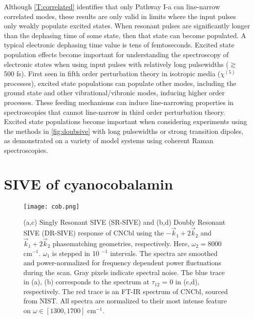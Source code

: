 \documentclass[aip, jcp, draft, onecolumn]{revtex4-2}
\begin{document}
Although \autoref{T:correlated} identifies that only Pathway I-a can line-narrow correlated modes, these results are only valid in limits where the input pulses only weakly populate excited states.
When resonant pulses are significantly longer than the dephasing time of some state, then that state can become populated.
A typical electronic dephasing time value is tens of femtoseconds. \cite{RN131}
Excited state population effects become important for understanding the spectroscopy of electronic states when using input pulses with relatively long pulsewidths ($\gtrsim$ 500 fs). \cite{RN319, Yurs2011}
First seen in fifth order perturbation theory in isotropic media ($\chi^{(5)}$ processes), excited state populations can populate other modes, including the ground state and other vibrational/vibronic modes, inducing higher order processes.\cite{Carlson87, RN471}
These feeding mechanisms can induce line-narrowing properties in spectroscopies that cannot line-narrow in third order perturbation theory.\cite{Ouellette1982, RN319, Carlson87, RN471, RN410}
Excited state populations become important when considering experiments using the methods in \autoref{fig:doubsive} with long pulsewidths or strong transition dipoles, as demonstrated on a variety of model systems using coherent Raman spectroscopies. \cite{Ouellette1982, RN471, RN338, Yurs2011} 

\section{SIVE of cyanocobalamin}

\begin{figure*}[!htbp]
	\centering
	\texttt{[image: cob.png]}
	\caption{
		(a,c) Singly Resonant SIVE (SR-SIVE) and (b,d) Doubly Resonant SIVE (DR-SIVE) response of CNCbl using the $-\vec{k}_1 + 2\vec{k}_2$ and $\vec{k}_1 + 2\vec{k}_2$ phasematching geometries, respectively.
		Here, $\omega_2 = 8000$ cm$^{-1}$.
		$\omega_1$ is stepped in 10 $^{-1}$ intervals.
		The spectra are smoothed and power-normalized for frequency dependent power fluctuations during the scan.
		Gray pixels indicate spectral noise.
		The blue trace in (a), (b) corresponds to the spectrum at $\tau_{12}$ = 0 in (c,d), respectively.
		The red trace is an FT-IR spectrum of CNCbl, sourced from NIST. 
		All spectra are normalized to their most intense feature on $\omega \in [1300, 1700]$ cm$^{-1}$.}
	\label{fig:cobsive}
\end{figure*}
\end{document}
